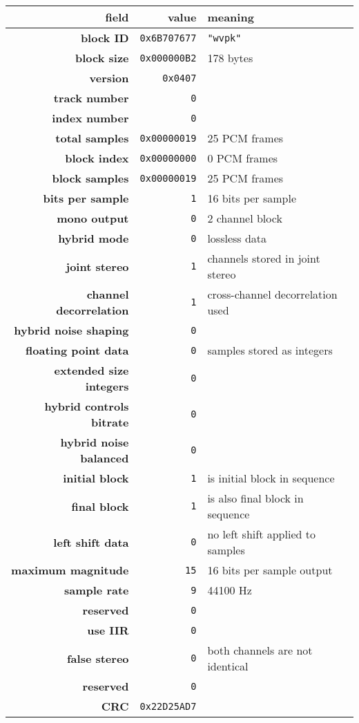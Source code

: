 \begin{table}
{\renewcommand{\arraystretch}{1.25}
\begin{tabular}{rrl}
field & value & meaning \\
\hline
\textbf{block ID} & \texttt{0x6B707677} & \texttt{"wvpk"} \\
\textbf{block size} & \texttt{0x000000B2} & 178 bytes \\
\textbf{version} & \texttt{0x0407} \\
\textbf{track number} & \texttt{0} \\
\textbf{index number} & \texttt{0} \\
\textbf{total samples} & \texttt{0x00000019} & 25 PCM frames \\
\textbf{block index} & \texttt{0x00000000} & 0 PCM frames \\
\textbf{block samples} & \texttt{0x00000019} & 25 PCM frames \\
\textbf{bits per sample} & \texttt{1} & 16 bits per sample \\
\textbf{mono output} & \texttt{0} & 2 channel block \\
\textbf{hybrid mode} & \texttt{0} & lossless data \\
\textbf{joint stereo} & \texttt{1} & channels stored in joint stereo \\
\textbf{channel decorrelation} & \texttt{1} & cross-channel decorrelation used \\
\textbf{hybrid noise shaping} & \texttt{0} \\
\textbf{floating point data} & \texttt{0} & samples stored as integers \\
\textbf{extended size integers} & \texttt{0} \\
\textbf{hybrid controls bitrate} & \texttt{0} \\
\textbf{hybrid noise balanced} & \texttt{0} \\
\textbf{initial block} & \texttt{1} & is initial block in sequence \\
\textbf{final block} & \texttt{1} & is also final block in sequence \\
\textbf{left shift data} & \texttt{0} & no left shift applied to samples \\
\textbf{maximum magnitude} & \texttt{15} & 16 bits per sample output \\
\textbf{sample rate} & \texttt{9} & 44100 Hz \\
\textbf{reserved} & \texttt{0} \\
\textbf{use IIR} & \texttt{0} \\
\textbf{false stereo} & \texttt{0} & both channels are not identical \\
\textbf{reserved} & \texttt{0} \\
\textbf{CRC} & \texttt{0x22D25AD7} \\
\end{tabular}
}
\end{table}

